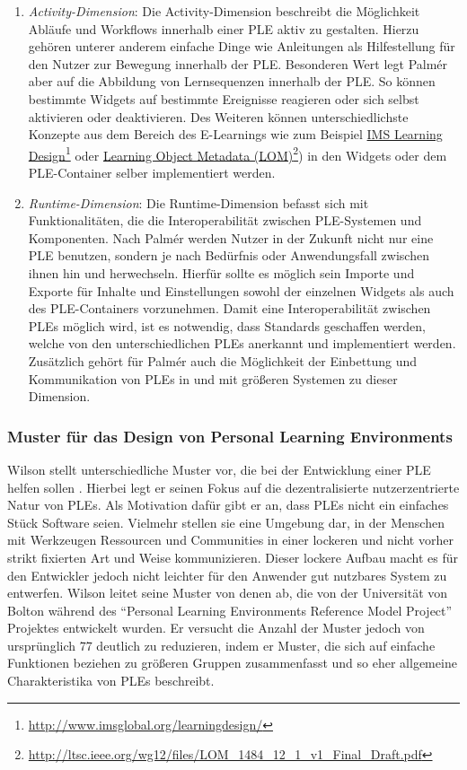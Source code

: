 \begin{enumerate}
 \item \emph{Activity-Dimension}: Die Activity-Dimension beschreibt die Möglichkeit Abläufe und Workflows innerhalb einer PLE aktiv zu gestalten. Hierzu gehören unterer anderem einfache Dinge wie Anleitungen als Hilfestellung für den Nutzer zur Bewegung innerhalb der PLE. Besonderen Wert legt Palmér aber auf die Abbildung von Lernsequenzen innerhalb der PLE. So können bestimmte Widgets auf bestimmte Ereignisse reagieren oder sich selbst aktivieren oder deaktivieren. Des Weiteren können unterschiedlichste Konzepte aus dem Bereich des E-Learnings wie zum Beispiel \href{http://www.imsglobal.org/learningdesign/}{IMS Learning Design}\footnote{\url{http://www.imsglobal.org/learningdesign/}} oder \href{http://ltsc.ieee.org/wg12/files/LOM_1484_12_1_v1_Final_Draft.pdf}{Learning Object Metadata (LOM)}\footnote{\url{http://ltsc.ieee.org/wg12/files/LOM_1484_12_1_v1_Final_Draft.pdf}}) in den Widgets oder dem PLE-Container selber implementiert werden.
 \item \emph{Runtime-Dimension}: Die Runtime-Dimension befasst sich mit Funktionalitäten, die die Interoperabilität zwischen PLE-Systemen und Komponenten. Nach Palmér werden Nutzer in der Zukunft nicht nur eine PLE benutzen, sondern je nach Bedürfnis oder Anwendungsfall zwischen ihnen hin und herwechseln. Hierfür sollte es möglich sein Importe und Exporte für Inhalte und Einstellungen sowohl der einzelnen Widgets als auch des PLE-Containers vorzunehmen. Damit eine Interoperabilität
 zwischen PLEs möglich wird, ist es notwendig, dass Standards geschaffen werden, welche von den unterschiedlichen PLEs anerkannt und implementiert werden. Zusätzlich gehört für Palmér auch die Möglichkeit der Einbettung und Kommunikation von PLEs in und mit größeren Systemen zu dieser Dimension.
\end{enumerate}

\subsubsection{Muster für das Design von Personal Learning Environments}\label{section:wilson_patterns}
Wilson stellt unterschiedliche Muster vor, die bei der Entwicklung einer PLE helfen sollen \cite{Wilson2008}. Hierbei legt er seinen Fokus auf die dezentralisierte  nutzerzentrierte Natur von PLEs. Als Motivation dafür gibt er an, dass PLEs nicht ein einfaches Stück Software seien. Vielmehr stellen sie eine Umgebung dar, in der Menschen mit Werkzeugen Ressourcen und Communities in einer lockeren und nicht vorher strikt fixierten Art und Weise kommunizieren. Dieser lockere Aufbau macht es für den Entwickler jedoch nicht leichter für den Anwender gut nutzbares System zu entwerfen. Wilson leitet seine Muster von denen ab, die von der Universität von Bolton während des "`Personal Learning Environments Reference Model Project"' Projektes entwickelt wurden. Er versucht die Anzahl der Muster jedoch von ursprünglich 77 deutlich zu reduzieren, indem er Muster, die sich auf einfache Funktionen beziehen zu größeren Gruppen zusammenfasst und so eher allgemeine Charakteristika von PLEs beschreibt.

